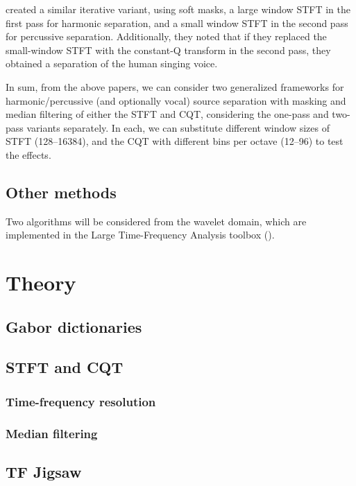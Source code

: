 \documentclass[10pt,letter]{article}
\begin{document}
\citet{fitzgerald2} created a similar iterative variant, using soft masks, a large window STFT in the first pass for harmonic separation, and a small window STFT in the second pass for percussive separation. Additionally, they noted that if they replaced the small-window STFT with the constant-Q transform in the second pass, they obtained a separation of the human singing voice.

In sum, from the above papers, we can consider two generalized frameworks for harmonic/percussive (and optionally vocal) source separation with masking and median filtering of either the STFT and CQT, considering the one-pass and two-pass variants separately. In each, we can substitute different window sizes of STFT (128--16384), and the CQT with different bins per octave (12--96) to test the effects.

\subsection{Other methods}

Two algorithms will be considered from the wavelet domain, which are implemented in the Large Time-Frequency Analysis toolbox (\cite{ltfat}).

\section{Theory}
\label{sec:theory}

\subsection{Gabor dictionaries}

\subsection{STFT and CQT}

\subsubsection{Time-frequency resolution}

\subsubsection{Median filtering}

\subsection{TF Jigsaw}
\end{document}
